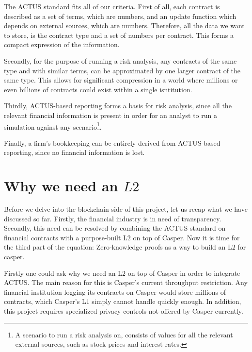 \documentclass[12pt]{article}
\begin{document}
The ACTUS standard fits all of our criteria. First of all, each contract is
described as a set of terms, which are numbers, and an update function which
depends on external sources, which are numbers. Therefore, all the data we want
to store, is the contract type and a set of numbers per contract. This forms a
compact expression of the information.

Secondly, for the purpose of running a risk analysis, any contracts of the same
type and with similar terms, can be approximated by one larger contract of the
same type. This allows for significant compression in a world where millions or
even billions of contracts could exist within a single isntitution.

Thirdly, ACTUS-based reporting forms a basis for risk analysis, since all the
relevant financial information is present in order for an analyst to run a
simulation against any scenario\footnote{
  A scenario to run a risk analysis on, consists of values for all the relevant
  external sources, such as stock prices and interest rates.
}.

Finally, a firm's bookkeeping can be entirely derived from ACTUS-based
reporting, since no financial information is lost.

\section{Why we need an $L2$} \label{l2}

Before we delve into the blockchain side of this project, let us recap what we
have discussed so far. Firstly, the financial industry is in need of
transparency. Secondly, this need can be resolved by combining the ACTUS
standard on financial contracts with a purpose-built L$2$ on top of Casper. Now
it is time for the third part of the equation: Zero-knowledge proofs as a way to
build an L$2$ for casper.

Firstly one could ask why we need an L$2$ on top of Casper in order to integrate
ACTUS. The main reason for this is Casper's current throughput restriction. Any
financial institution logging its contracts on Casper would store millions of
contracts, which Casper's L$1$ simply cannot handle quickly enough. In addition,
this project requires specialized privacy controls not offered by Casper
currently.

\end{document}

